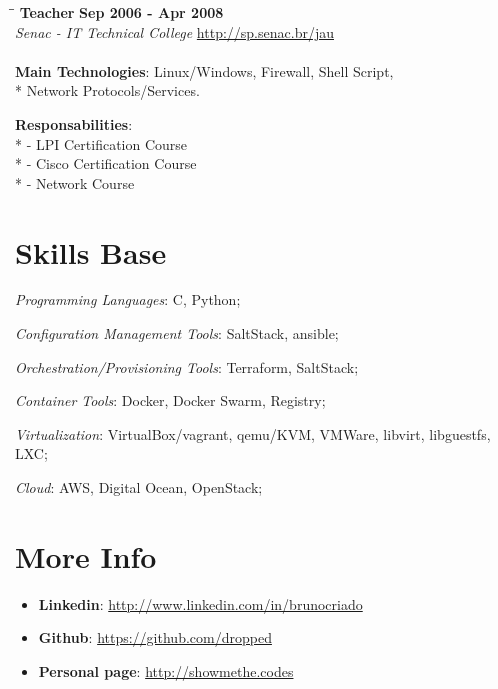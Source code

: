 \documentclass[margin]{res}
\begin{document}
\begin{resume}
\vspace{-0.1in}
\begin{tabbing}
  \hspace{2.3in}\= \hspace{1.7in}\= \kill %
  \textbf{Teacher}    \>\>\textbf{Sep 2006 - Apr 2008}\\
  \textit{Senac - IT Technical College} \url{http://sp.senac.br/jau}\\\\
  \textbf{Main Technologies}: Linux/Windows, Firewall, Shell Script,\\* 
  Network Protocols/Services.
\end{tabbing}\vspace{-20pt}      %
\vspace{2mm}\textbf{Responsabilities}: \\*
  - LPI Certification Course \\*
  - Cisco Certification Course \\*
  - Network Course \\

\section{Skills Base}
\textit{Programming Languages}: C, Python;

\textit{Configuration Management Tools}: SaltStack, ansible;

\textit{Orchestration/Provisioning Tools}: Terraform, SaltStack;

\textit{Container Tools}: Docker, Docker Swarm, Registry;

\textit{Virtualization}: VirtualBox/vagrant, qemu/KVM, VMWare, libvirt, libguestfs, LXC;

\textit{Cloud}: AWS, Digital Ocean, OpenStack;


\section{More Info}
\begin{itemize}
\item \textbf{Linkedin}: \url{http://www.linkedin.com/in/brunocriado}
\item \textbf{Github}: \url{https://github.com/dropped}
\item \textbf{Personal page}: \url{http://showmethe.codes}
\end{itemize}

\end{resume}
\end{document}
